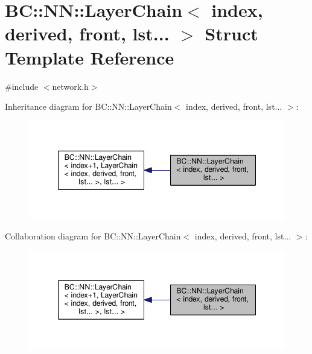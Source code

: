 \hypertarget{structBC_1_1NN_1_1LayerChain_3_01index_00_01derived_00_01front_00_01lst_8_8_8_01_4}{}\section{BC\+:\+:NN\+:\+:Layer\+Chain$<$ index, derived, front, lst... $>$ Struct Template Reference}
\label{structBC_1_1NN_1_1LayerChain_3_01index_00_01derived_00_01front_00_01lst_8_8_8_01_4}


{\ttfamily \#include $<$network.\+h$>$}



Inheritance diagram for BC\+:\+:NN\+:\+:Layer\+Chain$<$ index, derived, front, lst... $>$\+:
\nopagebreak
\begin{figure}[H]
\begin{center}
\leavevmode
\includegraphics[width=347pt]{structBC_1_1NN_1_1LayerChain_3_01index_00_01derived_00_01front_00_01lst_8_8_8_01_4__inherit__graph}
\end{center}
\end{figure}


Collaboration diagram for BC\+:\+:NN\+:\+:Layer\+Chain$<$ index, derived, front, lst... $>$\+:
\nopagebreak
\begin{figure}[H]
\begin{center}
\leavevmode
\includegraphics[width=347pt]{structBC_1_1NN_1_1LayerChain_3_01index_00_01derived_00_01front_00_01lst_8_8_8_01_4__coll__graph}
\end{center}
\end{figure}
